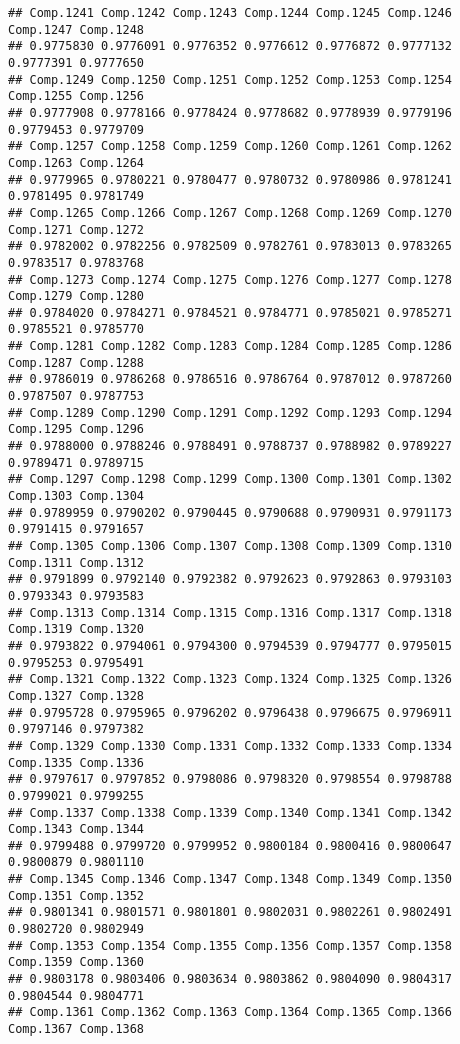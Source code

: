 \documentclass[
]{article}
\begin{document}
\begin{verbatim}
## Comp.1241 Comp.1242 Comp.1243 Comp.1244 Comp.1245 Comp.1246 Comp.1247 Comp.1248 
## 0.9775830 0.9776091 0.9776352 0.9776612 0.9776872 0.9777132 0.9777391 0.9777650 
## Comp.1249 Comp.1250 Comp.1251 Comp.1252 Comp.1253 Comp.1254 Comp.1255 Comp.1256 
## 0.9777908 0.9778166 0.9778424 0.9778682 0.9778939 0.9779196 0.9779453 0.9779709 
## Comp.1257 Comp.1258 Comp.1259 Comp.1260 Comp.1261 Comp.1262 Comp.1263 Comp.1264 
## 0.9779965 0.9780221 0.9780477 0.9780732 0.9780986 0.9781241 0.9781495 0.9781749 
## Comp.1265 Comp.1266 Comp.1267 Comp.1268 Comp.1269 Comp.1270 Comp.1271 Comp.1272 
## 0.9782002 0.9782256 0.9782509 0.9782761 0.9783013 0.9783265 0.9783517 0.9783768 
## Comp.1273 Comp.1274 Comp.1275 Comp.1276 Comp.1277 Comp.1278 Comp.1279 Comp.1280 
## 0.9784020 0.9784271 0.9784521 0.9784771 0.9785021 0.9785271 0.9785521 0.9785770 
## Comp.1281 Comp.1282 Comp.1283 Comp.1284 Comp.1285 Comp.1286 Comp.1287 Comp.1288 
## 0.9786019 0.9786268 0.9786516 0.9786764 0.9787012 0.9787260 0.9787507 0.9787753 
## Comp.1289 Comp.1290 Comp.1291 Comp.1292 Comp.1293 Comp.1294 Comp.1295 Comp.1296 
## 0.9788000 0.9788246 0.9788491 0.9788737 0.9788982 0.9789227 0.9789471 0.9789715 
## Comp.1297 Comp.1298 Comp.1299 Comp.1300 Comp.1301 Comp.1302 Comp.1303 Comp.1304 
## 0.9789959 0.9790202 0.9790445 0.9790688 0.9790931 0.9791173 0.9791415 0.9791657 
## Comp.1305 Comp.1306 Comp.1307 Comp.1308 Comp.1309 Comp.1310 Comp.1311 Comp.1312 
## 0.9791899 0.9792140 0.9792382 0.9792623 0.9792863 0.9793103 0.9793343 0.9793583 
## Comp.1313 Comp.1314 Comp.1315 Comp.1316 Comp.1317 Comp.1318 Comp.1319 Comp.1320 
## 0.9793822 0.9794061 0.9794300 0.9794539 0.9794777 0.9795015 0.9795253 0.9795491 
## Comp.1321 Comp.1322 Comp.1323 Comp.1324 Comp.1325 Comp.1326 Comp.1327 Comp.1328 
## 0.9795728 0.9795965 0.9796202 0.9796438 0.9796675 0.9796911 0.9797146 0.9797382 
## Comp.1329 Comp.1330 Comp.1331 Comp.1332 Comp.1333 Comp.1334 Comp.1335 Comp.1336 
## 0.9797617 0.9797852 0.9798086 0.9798320 0.9798554 0.9798788 0.9799021 0.9799255 
## Comp.1337 Comp.1338 Comp.1339 Comp.1340 Comp.1341 Comp.1342 Comp.1343 Comp.1344 
## 0.9799488 0.9799720 0.9799952 0.9800184 0.9800416 0.9800647 0.9800879 0.9801110 
## Comp.1345 Comp.1346 Comp.1347 Comp.1348 Comp.1349 Comp.1350 Comp.1351 Comp.1352 
## 0.9801341 0.9801571 0.9801801 0.9802031 0.9802261 0.9802491 0.9802720 0.9802949 
## Comp.1353 Comp.1354 Comp.1355 Comp.1356 Comp.1357 Comp.1358 Comp.1359 Comp.1360 
## 0.9803178 0.9803406 0.9803634 0.9803862 0.9804090 0.9804317 0.9804544 0.9804771 
## Comp.1361 Comp.1362 Comp.1363 Comp.1364 Comp.1365 Comp.1366 Comp.1367 Comp.1368 

\end{verbatim}
\end{document}
